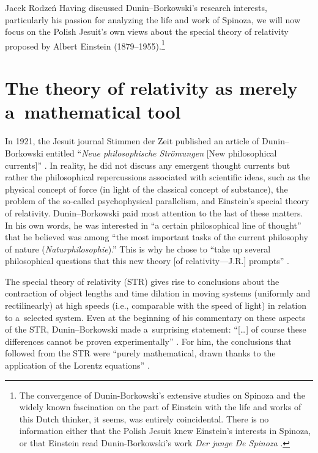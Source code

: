 \begin{artengenv}{Jacek Rodzeń}
Having discussed Dunin–Borkowski's research interests, particularly his passion for analyzing the life and work of Spinoza, we will now focus on the Polish Jesuit's own views about the special theory of relativity proposed by Albert Einstein (1879–1955).\footnote{The convergence of Dunin-Borkowski's extensive studies on Spinoza and the widely known fascination on the part of Einstein with the life and works of this Dutch thinker, it seems, was entirely coincidental. There is no information either that the Polish Jesuit knew Einstein's interests in Spinoza, or that Einstein read Dunin-Borkowski's work \textit{Der junge De Spinoza}
\parencite*[][]{dunin-borkowski_junge_1910}.%
}

\section{The theory of relativity as merely\\a~mathematical tool}
In 1921, the Jesuit journal Stimmen der Zeit published an article of Dunin–Borkowski entitled ``\textit{Neue philosophische Strömungen} [New philosophical currents]''
\parencite*[][]{dunin-borkowski_neue_1921}. %
 In reality, he did not discuss any emergent thought currents but rather the philosophical repercussions associated with scientific ideas, such as the physical concept of force (in light of the classical concept of substance), the problem of the so-called psychophysical parallelism, and Einstein's special theory of relativity. Dunin–Borkowski paid most attention to the last of these matters. In his own words, he was interested in ``a certain philosophical line of thought'' that he believed was among ``the most important tasks of the current philosophy of nature (\textit{Naturphilosophie}).'' This is why he chose to ``take up several philosophical questions that this new theory [of relativity---J.R.] prompts'' 
\parencite*[][p.211]{dunin-borkowski_neue_1921}.%


The special theory of relativity (STR) gives rise to conclusions about the contraction of object lengths and time dilation in moving systems (uniformly and rectilinearly) at high speeds (i.e., comparable with the speed of light) in relation to a~selected system. Even at the beginning of his commentary on these aspects of the STR, Dunin–Borkowski made a~surprising statement: ``[…] of course these differences cannot be proven experimentally''
\parencite*[][p.211]{dunin-borkowski_neue_1921}. %
 For him, the conclusions that followed from the STR were ``purely mathematical, drawn thanks to the application of the Lorentz equations'' 
\parencite*[][p.212]{dunin-borkowski_neue_1921}.%



\end{artengenv}
